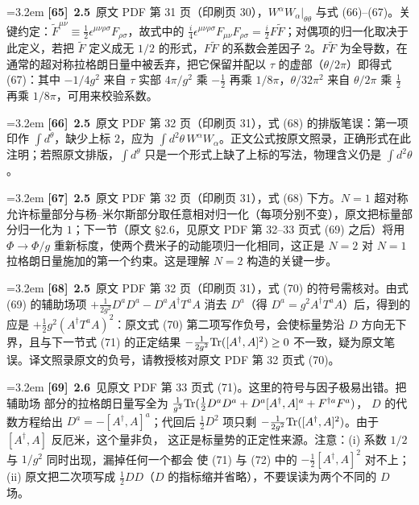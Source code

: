 \par
\par\medskip\noindent\hangindent=3.2em \textbf{[65]}~\textbf{2.5}~原文 PDF 第 31 页（印刷页 30），$W^\alpha W_\alpha|_{\theta\theta}$ 与式 (66)--(67)。关键约定：$\widetilde F^{\mu\nu}\equiv\frac12\epsilon^{\mu\nu\rho\sigma}F_{\rho\sigma}$，故式中的 $\frac i4\epsilon^{\mu\nu\rho\sigma}F_{\mu\nu}F_{\rho\sigma}=\frac i2 F\widetilde F$；对偶项的归一化取决于此定义，若把 $\widetilde F$ 定义成无 $1/2$ 的形式，$F\widetilde F$ 的系数会差因子 2。$F\widetilde F$ 为全导数，在通常的超对称拉格朗日量中被丢弃，把它保留并配以 $\tau$ 的虚部（$\theta/2\pi$）即得式 (67)：其中 $-1/4g^2$ 来自 $\tau$ 实部 $4\pi/g^2$ 乘 $-\frac12$ 再乘 $1/8\pi$，$\theta/32\pi^2$ 来自 $\theta/2\pi$ 乘 $\frac12$ 再乘 $1/8\pi$，可用来校验系数。
\par
\par\medskip\noindent\hangindent=3.2em \textbf{[66]}~\textbf{2.5}~原文 PDF 第 32 页（印刷页 31），式 (68) 的排版笔误：第一项印作 $\int d^\theta$，缺少上标 $2$，应为 $\int d^2\theta\,W^\alpha W_\alpha$。正文公式按原文照录，正确形式在此注明；若照原文排版，$\int d^\theta$ 只是一个形式上缺了上标的写法，物理含义仍是 $\int d^2\theta$。
\par
\par\medskip\noindent\hangindent=3.2em \textbf{[67]}~\textbf{2.5}~原文 PDF 第 32 页（印刷页 31），式 (68) 下方。$N=1$ 超对称允许标量部分与杨--米尔斯部分取任意相对归一化（每项分别不变），原文把标量部分归一化为 $1$；下一节（原文 §2.6，见原文 PDF 第 32--33 页式 (69) 之后）将用 $\Phi\to\Phi/g$ 重新标度，使两个费米子的动能项归一化相同，这正是 $N=2$ 对 $N=1$ 拉格朗日量施加的第一个约束。这是理解 $N=2$ 构造的关键一步。
\par
\par\medskip\noindent\hangindent=3.2em \textbf{[68]}~\textbf{2.5}~原文 PDF 第 32 页（印刷页 31），式 (70) 的符号需核对。由式 (69) 的辅助场项 $+\frac{1}{2g^2}D^aD^a-D^aA^\dagger T^aA$ 消去 $D^a$（得 $D^a=g^2A^\dagger T^aA$）后，得到的应是 $+\frac12g^2(A^\dagger T^aA)^2$：原文式 (70) 第二项写作负号，会使标量势沿 $D$ 方向无下界，且与下一节式 (71) 的正定结果 $-\frac{1}{2g^2}{\rm Tr}([A^\dagger,A]^2)\geq0$ 不一致，疑为原文笔误。译文照录原文的负号，请教授核对原文 PDF 第 32 页式 (70)。
\par
\par\medskip\noindent\hangindent=3.2em \textbf{[69]}~\textbf{2.6}~见原文 PDF 第 33 页式 (71)。这里的符号与因子极易出错。把辅助场 部分的拉格朗日量写全为 $\frac{1}{g^2}{\rm Tr}(\frac{1}{2}D^aD^a+D^a[A^\dagger,A]^a+F^{\dagger a}F^a)$， $D$ 的代数方程给出 $D^a=-[A^\dagger,A]^a$；代回后 $\frac{1}{2}D^2$ 项只剩 $-\frac{1}{2g^2}{\rm Tr}([A^\dagger,A]^2)$。由于 $[A^\dagger,A]$ 反厄米，这个量非负， 这正是标量势的正定性来源。注意：(i) 系数 $1/2$ 与 $1/g^2$ 同时出现，漏掉任何一个都会 使 (71) 与 (72) 中的 $-\frac{1}{2}[A^\dagger,A]^2$ 对不上；(ii) 原文把二次项写成 $\frac{1}{2}DD$（$D$ 的指标缩并省略），不要误读为两个不同的 $D$ 场。
